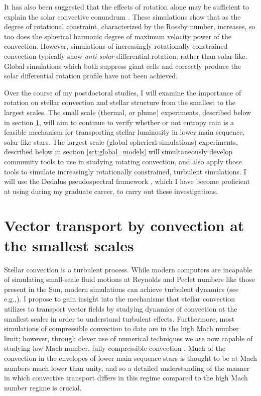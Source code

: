 \documentclass[aasms,12pt]{article}
\begin{document}
It has also been suggested that the effects of rotation alone may be sufficient to explain the solar convective conundrum \citep{featherstone&hindman2016}.
These simulations show that as the degree of rotational constraint, characterized by the Rossby number, increases, so too does the spherical harmonic degree of maximum velocity power of the convection.
However, simulations of increasingly rotationally constrained convection typically show \emph{anti-solar} differential rotation, rather than solar-like.
Global simulations which both suppress giant cells and correctly produce the solar differential rotation profile have not been achieved.

Over the course of my postdoctoral studies, I will examine the importance of rotation on stellar convection and stellar structure from the smallest to the largest scales.
The small scale (thermal, or plume) experiments, described below in section \ref{sct:thermals}, will aim to continue to verify whether or not entropy rain is a feasible mechanism for transporting stellar luminosity in lower main sequence, solar-like stars.
The largest scale (global spherical simulations) experiments, described below in section \ref{sct:global_models} will simultaneously develop community tools to use in studying rotating convection, and also apply those tools to simulate increasingly rotationally constrained, turbulent simulations.
I will use the Dedalus pseudospectral framework \citep{burns&all2019}, which I have become proficient at using during my graduate career, to carry out these investigations.


\section{Vector transport by convection at the smallest scales}
\label{sct:thermals}
Stellar convection is a turbulent process.
While modern computers are incapable of simulating small-scale fluid motions at Reynolds and Peclet numbers like those present in the Sun, modern simulations can achieve turbulent dynamics (see e.g.,).
I propose to gain insight into the mechanisms that stellar convection utilizes to transport vector fields by studying dynamics of convection at the smallest scales in order to understand turbulent effects.
Furthermore, most simulations of compressible convection to date are in the high Mach number limit; however, through clever use of numerical techniques we are now capable of studying low Mach number, fully compressible convection \citep{anders&brown2017}.
Much of the convection in the envelopes of lower main sequence stars is thought to be at Mach numbers much lower than unity, and so a detailed understanding of the manner in which convective transport differs in this regime compared to the high Mach number regime is crucial.
\end{document}
